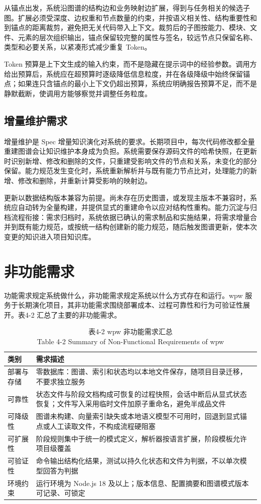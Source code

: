 从锚点出发，系统沿图谱的结构边和业务映射边扩展，得到与任务相关的候选子图。扩展必须受深度、边权重和节点数量的约束，并按语义相关性、结构重要性和到锚点的距离裁剪，避免把无关代码带入上下文。裁剪后的子图按能力、模块、文件、元素的层次组织输出，锚点保留较完整的属性与签名，较远节点只保留名称、类型和必要关系，以紧凑形式减少重复 Token。

Token 预算是上下文生成的输入约束，而不是隐藏在提示词中的经验参数。调用方给出预算后，系统应在超预算时逐级降低信息粒度，并在各级降级中始终保留锚点；如果连只含锚点的最小上下文仍超出预算，系统应明确报告预算不足，而不是静默截断，使调用方能够察觉并调整任务粒度。


\subsection{增量维护需求}
增量维护是 Spec 增量知识演化对系统的要求。长期项目中，每次代码修改都全量重建图谱会让知识维护本身成为负担。系统需要保存源码文件的哈希快照，在更新时识别新增、修改和删除的文件，只重建受影响文件的节点和关系，未变化的部分保留。能力规范发生变化时，系统重新解析并与既有能力节点比对，处理能力的新增、修改和删除，并重新计算受影响的映射边。

更新以数据结构版本兼容为前提。尚未存在历史图谱，或发现主版本不兼容时，系统应自动转为全量构建，并提供显式的重建命令以应对结构性重构。能力沉淀与归档流程衔接：需求归档时，系统依据已确认的需求制品和实施结果，将需求增量合并到既有能力规范，或按统一结构创建新的能力规范，随后触发图谱更新，使本次变更的知识进入项目知识库。


\section{非功能需求}
功能需求规定系统做什么，非功能需求规定系统以什么方式存在和运行。wpw 服务于长期演化项目，其非功能需求围绕部署成本、过程可靠性和行为可验证性展开。表4-2 汇总了主要的非功能需求。

\begin{table}[htbp]
\centering
\small
\caption{表4-2 wpw 非功能需求汇总\\Table 4-2 Summary of Non-Functional Requirements of wpw}
\begin{tabularx}{\textwidth}{|X|X|}
\hline
\textbf{类别} & \textbf{需求描述} \\
\hline
部署与存储 & 零数据库：图谱、索引和状态均以本地文件保存，随项目目录迁移，不要求独立服务 \\
可靠性 & 状态文件与阶段文档构成可恢复的过程快照，会话中断后从显式状态恢复；文件写入采用临时文件加原子重命名，避免半成品文件 \\
可降级性 & 图谱未构建、向量索引缺失或本地语义模型不可用时，回退到显式锚点或人工读取文件，不构成流程硬阻塞 \\
可扩展性 & 阶段规则集中于统一的模式定义，解析器按语言扩展，阶段模板允许项目级覆盖 \\
可验证性 & 命令输出结构化结果，测试以持久化状态和文件为判据，不以单次模型回答为判据 \\
环境约束 & 运行环境为 Node.js 18 及以上；版本信息、配置摘要和图谱模式版本可记录、可锁定 \\
\hline
\end{tabularx}
\end{table}

